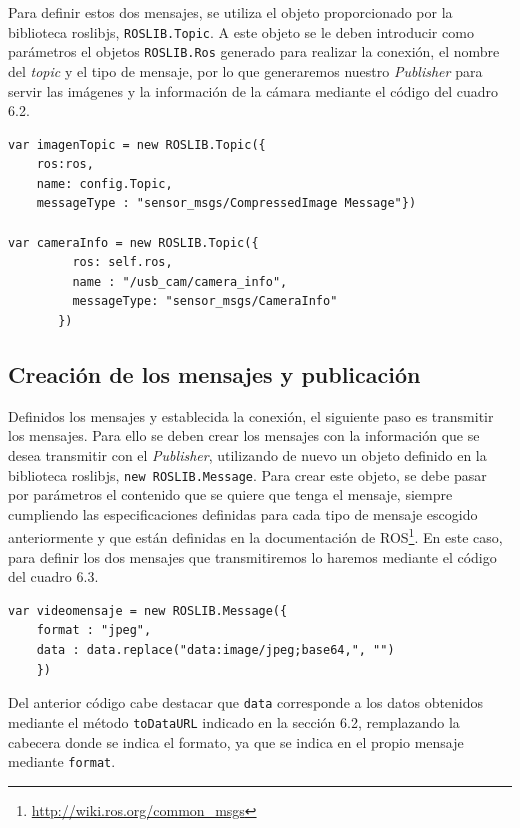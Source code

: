 Para definir estos dos mensajes, se utiliza el objeto proporcionado por la biblioteca roslibjs, \texttt{ROSLIB.Topic}. A este objeto se le deben introducir como parámetros el objetos \texttt{ROSLIB.Ros} generado para realizar la conexión, el nombre del \textit{topic} y el tipo de mensaje, por lo que generaremos nuestro \textit{Publisher} para servir las imágenes y la información de la cámara mediante el código del cuadro 6.2.
\begin{lstlisting}[caption= Estructura de los mensajes, label=cod.estrucuturamensajes]
var imagenTopic = new ROSLIB.Topic({
	ros:ros, 
	name: config.Topic, 
	messageType : "sensor_msgs/CompressedImage Message"})
	
var cameraInfo = new ROSLIB.Topic({
         ros: self.ros,
         name : "/usb_cam/camera_info",
         messageType: "sensor_msgs/CameraInfo"
       })

\end{lstlisting}

\subsection{Creación de los mensajes y publicación}
Definidos los mensajes y establecida la conexión, el siguiente paso es transmitir los mensajes. Para ello se deben crear los mensajes con la información que se desea transmitir con el \textit{Publisher}, utilizando de nuevo un objeto definido en la biblioteca roslibjs, \texttt{new ROSLIB.Message}. Para crear este objeto, se debe pasar por parámetros el contenido que se quiere que tenga el mensaje, siempre cumpliendo las especificaciones definidas para cada tipo de mensaje escogido anteriormente y que están definidas en la documentación de ROS\footnote{\url{http://wiki.ros.org/common_msgs}}. En este caso, para definir los dos mensajes que transmitiremos lo haremos mediante el código del cuadro 6.3.
\begin{lstlisting}[caption= Definición del mensaje para las imágenes, label=cod.definicionmensajeimg]
 var videomensaje = new ROSLIB.Message({
 	format : "jpeg", 
	data : data.replace("data:image/jpeg;base64,", "")
	})

\end{lstlisting}
Del anterior código cabe destacar que \texttt{data} corresponde a los datos obtenidos mediante el método \texttt{toDataURL} indicado en la sección 6.2, remplazando la cabecera donde se indica el formato, ya que se indica en el propio mensaje mediante \texttt{format}. 

